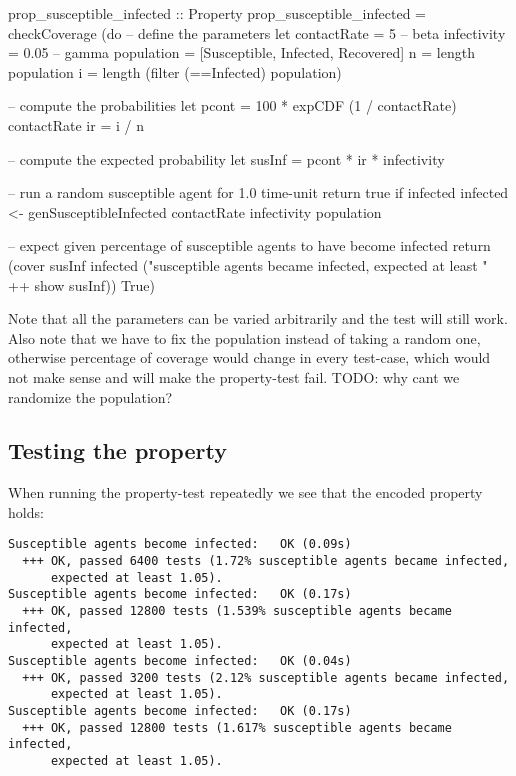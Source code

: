 \begin{HaskellCode}
prop_susceptible_infected :: Property
prop_susceptible_infected = checkCoverage (do  
  -- define the parameters
  let contactRate = 5     -- beta
      infectivity = 0.05  -- gamma
      population  = [Susceptible, Infected, Recovered]
      n           = length population
      i           = length (filter (==Infected) population)
      	  
  -- compute the probabilities
  let pcont = 100 * expCDF (1 / contactRate) contactRate
      ir    = i / n
    
  -- compute the expected probability
  let susInf = pcont * ir * infectivity

  -- run a random susceptible agent for 1.0 time-unit return true if infected
  infected <- genSusceptibleInfected contactRate infectivity population

  -- expect given percentage of susceptible agents to have become infected
  return (cover susInf infected
          ("susceptible agents became infected, expected at least " ++ show susInf)) True)
\end{HaskellCode}

Note that all the parameters can be varied arbitrarily and the test will still work. Also note that we have to fix the population instead of taking a random one, otherwise percentage of coverage would change in every test-case, which would not make sense and will make the property-test fail.
TODO: why cant we randomize the population?

\subsection{Testing the property}
When running the property-test repeatedly we see that the encoded property holds:

\begin{verbatim}
Susceptible agents become infected:   OK (0.09s)
  +++ OK, passed 6400 tests (1.72% susceptible agents became infected, 
      expected at least 1.05).
Susceptible agents become infected:   OK (0.17s)
  +++ OK, passed 12800 tests (1.539% susceptible agents became infected, 
      expected at least 1.05).
Susceptible agents become infected:   OK (0.04s)
  +++ OK, passed 3200 tests (2.12% susceptible agents became infected, 
      expected at least 1.05).
Susceptible agents become infected:   OK (0.17s)
  +++ OK, passed 12800 tests (1.617% susceptible agents became infected,
      expected at least 1.05).    
\end{verbatim}

